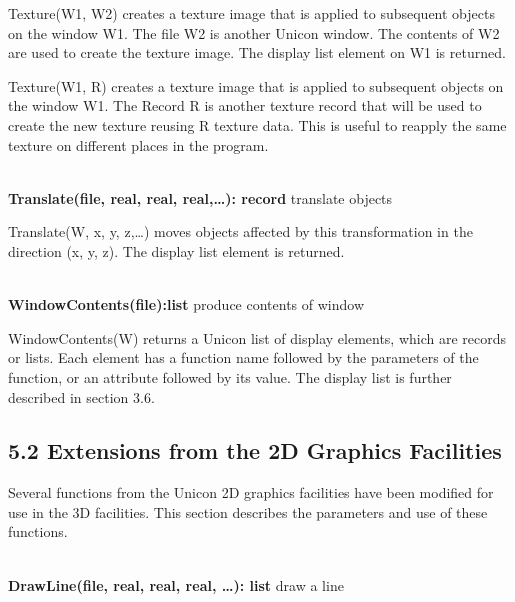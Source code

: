 \documentclass[letterpaper]{article}
\begin{document}
\textsf{Texture(W1, W2) }creates a texture image that is applied to
subsequent objects on the window \textsf{W1}. The file \textsf{W2} is
another Unicon window. The contents of \textsf{W2} are used to create
the texture image. The display list element on \textsf{W1} is
returned.

\textsf{Texture(W1, R) }creates a texture image that is applied to
subsequent objects on the window \textsf{W1}. The Record \textsf{R} is
another texture record that will be used to create the new texture
reusing R texture data. This is useful to reapply the same texture on
different places in the program.

\noindent\hrulefill\\
\noindent\textsf{\textbf{Translate(file, real, real, real,{\dots}): record}}
\hfill translate objects


\bigskip

{
\textsf{Translate(W, x, y, z,{\dots})} moves objects affected by this transformation in the direction (x, y, z). The
display list element is returned.}

\noindent\hrulefill\\
\noindent\textsf{\textbf{WindowContents(file):list}}
\hfill produce contents of window


\bigskip

\textsf{WindowContents(W)} returns a Unicon list of display elements,
which are records or lists. Each element has a function name followed
by the parameters of the function, or an attribute followed by its
value. The display list is further described in section 3.6.

\bigskip

\bigskip

\subsection[5.2 Extensions from the 2D Graphics Facilities]
{5.2 Extensions from the 2D Graphics Facilities}


\bigskip

Several functions from the Unicon 2D graphics facilities have been
modified for use in the 3D facilities. This section describes the
parameters and use of these functions.

\bigskip

\bigskip

\noindent\hrulefill\\
\noindent\textsf{\textbf{DrawLine(file, real, real, real, {\dots}): list}}
\hfill draw a line
\end{document}
